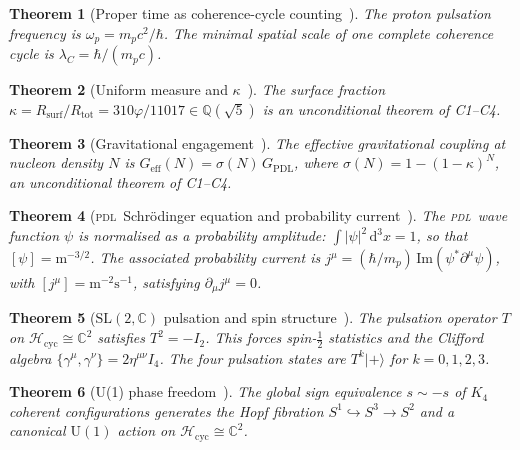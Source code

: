 \documentclass[12pt,a4paper]{article}
\newtheorem{theorem}{Theorem}[section]
\newcommand{\Kfour}{K_4}
\newcommand{\hb}{\hbar}
\newcommand{\PDL}{\textsc{pdl}}
\newcommand{\sig}{\sigma}
\newcommand{\GPDL}{G_{\mathrm{PDL}}}
\newcommand{\Geff}{G_{\mathrm{eff}}}
\newcommand{\Rsurf}{R_{\mathrm{surf}}}
\newcommand{\Rtot}{R_{\mathrm{tot}}}
\newcommand{\lambdaC}{\lambda_C}
\newcommand{\vp}{\varphi}
\begin{document}
\begin{theorem}[Proper time as coherence-cycle counting~{\cite{PDL_D10a_2026}}]
\label{thm:D10a}
The proton pulsation frequency is $\omega_p = m_p c^2/\hb$. The minimal spatial scale of one complete coherence cycle is $\lambdaC = \hb/(m_p c)$.
\end{theorem}

\begin{theorem}[Uniform measure and $\kappa$~{\cite{PDL_D42_2026}}]
\label{thm:H3}
The surface fraction $\kappa = \Rsurf/\Rtot = 310\vp/11017 \in \mathbb{Q}(\sqrt{5})$ is an unconditional theorem of C1--C4.
\end{theorem}

\begin{theorem}[Gravitational engagement~{\cite{PDL_D24_2026,PDL_D42_2026}}]
\label{thm:sigma}
The effective gravitational coupling at nucleon density $N$ is $\Geff(N) = \sig(N)\,\GPDL$, where $\sig(N) = 1-(1-\kappa)^N$, an unconditional theorem of C1--C4.
\end{theorem}

\begin{theorem}[\PDL\ Schr\"{o}dinger equation and probability current~{\cite{PDL_D32_2026}}]
\label{thm:D32}
The \PDL\ wave function $\psi$ is normalised as a probability amplitude: $\int|\psi|^2\,\mathrm{d}^3x = 1$, so that $[\psi] = \mathrm{m}^{-3/2}$. The associated probability current is $j^\mu = (\hb/m_p)\,\mathrm{Im}(\psi^*\partial^\mu\psi)$, with $[j^\mu] = \mathrm{m}^{-2}\mathrm{s}^{-1}$, satisfying $\partial_\mu j^\mu = 0$.
\end{theorem}

\begin{theorem}[$\mathrm{SL}(2,\mathbb{C})$ pulsation and spin structure~{\cite{PDL_D33_2026}}]
\label{thm:D33}
The pulsation operator $T$ on $\mathcal{H}_{\mathrm{cyc}} \cong \mathbb{C}^2$ satisfies $T^2 = -I_2$. This forces spin-$\tfrac{1}{2}$ statistics and the Clifford algebra $\{\gamma^\mu,\gamma^\nu\} = 2\eta^{\mu\nu}I_4$. The four pulsation states are $T^k|{+}\rangle$ for $k = 0,1,2,3$.
\end{theorem}

\begin{theorem}[U(1) phase freedom~{\cite{PDL_D46_2026}}]
\label{thm:D46}
The global sign equivalence $s\sim -s$ of $\Kfour$ coherent configurations generates the Hopf fibration $S^1\hookrightarrow S^3\to S^2$ and a canonical $\mathrm{U}(1)$ action on $\mathcal{H}_{\mathrm{cyc}}\cong\mathbb{C}^2$.
\end{theorem}
\end{document}
